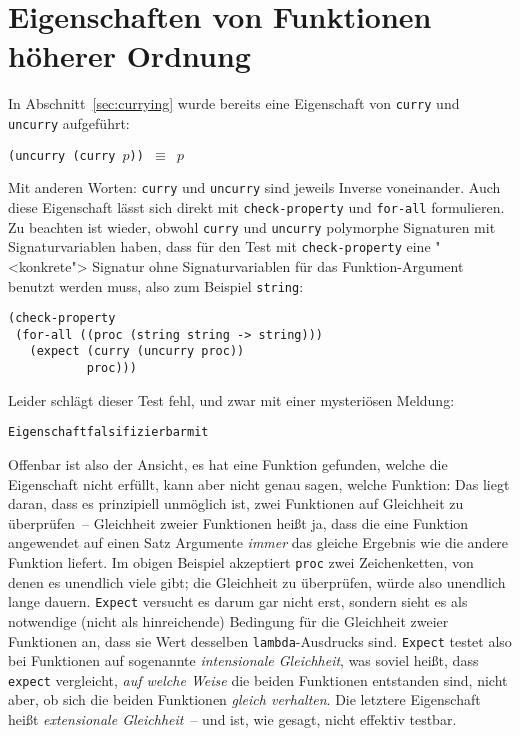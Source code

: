 \section{Eigenschaften von Funktionen höherer Ordnung}
\label{sec:ho-props}

In Abschnitt~\ref{sec:currying} wurde bereits eine Eigenschaft von
\lstinline{curry} und
\lstinline{uncurry} aufgeführt:
%
\begin{center}
  \texttt{(uncurry (curry $p$)) $\equiv$ $p$}
\end{center}
%
Mit anderen Worten: \lstinline{curry} und \lstinline{uncurry} sind jeweils
Inverse voneinander.  Auch diese Eigenschaft lässt sich direkt mit
\lstinline{check-property} und \lstinline{for-all} formulieren.  Zu beachten
ist wieder, obwohl \lstinline{curry} und \lstinline{uncurry} polymorphe
Signaturen mit Signaturvariablen haben, dass für den Test mit
\lstinline{check-property} eine "<konkrete"> Signatur ohne
Signaturvariablen für das Funktion-Argument benutzt werden muss, also
zum Beispiel \lstinline{string}:
%
\begin{lstlisting}
(check-property
 (for-all ((proc (string string -> string)))
   (expect (curry (uncurry proc))
           proc)))
\end{lstlisting}
%
Leider schlägt dieser Test fehl, und zwar mit einer mysteriösen
Meldung:
%
\begin{alltt}
Eigenschaft falsifizierbar mit 
\end{alltt}
%
Offenbar ist \drscheme{} also der Ansicht, es hat eine Funktion gefunden,
welche die Eigenschaft nicht erfüllt, kann aber nicht genau sagen,
welche Funktion: Das liegt daran, dass es prinzipiell unmöglich ist,
zwei Funktionen auf Gleichheit zu überprüfen~-- Gleichheit zweier
Funktionen heißt ja, dass die eine Funktion angewendet auf einen Satz
Argumente \emph{immer} das gleiche Ergebnis wie die andere Funktion
liefert.  Im obigen Beispiel akzeptiert \lstinline{proc} zwei
Zeichenketten, von denen es unendlich viele gibt; die Gleichheit zu
überprüfen, würde also unendlich lange dauern.  \lstinline{Expect}
versucht es darum gar nicht erst, sondern sieht es als notwendige
(nicht als hinreichende) Bedingung für die Gleichheit zweier
Funktionen an, dass sie Wert desselben \lstinline{lambda}-Ausdrucks sind.
\lstinline{Expect} testet also bei Funktionen auf sogenannte
\textit{intensionale Gleichheit}, was soviel heißt, dass
\lstinline{expect} vergleicht, \emph{auf welche Weise} die beiden
Funktionen entstanden sind, nicht aber, ob sich die beiden Funktionen
\emph{gleich verhalten}.  Die letztere Eigenschaft heißt \textit{extensionale
  Gleichheit}~-- und ist, wie gesagt, nicht effektiv testbar.

